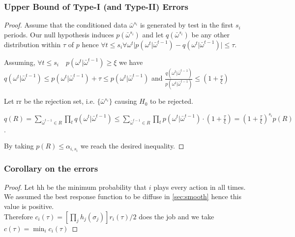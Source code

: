 \documentclass[]{spie}  %
\begin{document}
\subsubsection{Upper Bound of Type-I (and Type-II) Errors}
\begin{proof}
Assume that the conditioned data $\bar{\omega}^{s_i}$ is generated by test in the first $s_i$ periods. Our null hypothesis induces $p(\bar{\omega}^{s_i})$ and let $q(\bar{\omega}^{s_i})$ be any other distribution within $\tau$ of $p$ hence $\forall t\leq s_i \forall \omega^t  \lvert p(\omega^t|\bar{\omega}^{t-1}) - q(\omega^t|\bar{\omega}^{t-1}) \rvert \leq \tau$.

Assuming, $\forall t \leq s_i \quad p(\omega^t|\bar{\omega}^{t-1}) \geq \xi$ we have $q(\omega^t|\bar{\omega}^{t-1}) \leq p(\omega^t|\bar{\omega}^{t-1}) + \tau \leq p(\omega^t|\bar{\omega}^{t-1})$ and $\frac{q(\omega^t|\bar{\omega}^{t-1})}{p(\omega^t|\bar{\omega}^{t-1})} \leq (1+\frac{\tau}{\xi})$

Let \gls{rr} be the rejection set, i.e. $ \{ \bar{\omega}^{s_i} \} $ causing $H_0$ to be rejected.

$q(R) = \sum_{\bar{\omega}^{t-1} \in R} \prod_t q(\omega^t|\bar{\omega}^{t-1}) \leq \sum_{\bar{\omega}^{t-1} \in R} \prod_t p(\omega^t|\bar{\omega}^{t-1}) \cdot (1+\frac{\tau}{\xi}) = (1+\frac{\tau}{\xi})^{s_i} p(R)$.

By taking $p(R) \leq \alpha_{i, s_i}$ we reach the desired inequality.
\end{proof}

\subsubsection{Corollary on the errors}
\begin{proof}
Let \gls{hh} be the minimum probability that $i$ plays every action in all times. We assumed the best response function to be diffuse in \autoref{sec:smooth} hence this value is positive. \\Therefore $c_i(\tau) = [\prod_j h_j(\sigma_j)] r_i(\tau)/2$ does the job and we take $c(\tau) = \min_i c_i(\tau)$
\end{proof}
\end{document}
